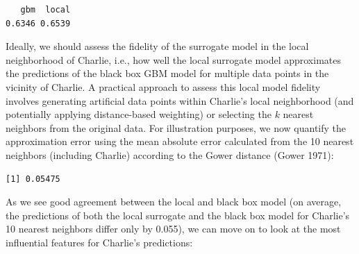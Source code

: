 \begin{verbatim}
   gbm  local 
0.6346 0.6539 
\end{verbatim}

Ideally, we should assess the fidelity of the surrogate model in the
local neighborhood of Charlie, i.e., how well the local surrogate model
approximates the predictions of the black box GBM model for multiple
data points in the vicinity of Charlie. A practical approach to assess
this local model fidelity involves generating artificial data points
within Charlie's local neighborhood (and potentially applying
distance-based weighting) or selecting the \(k\) nearest neighbors from
the original data. For illustration purposes, we now quantify the
approximation error using the mean absolute error calculated from the 10
nearest neighbors (including Charlie) according to the Gower distance
(Gower 1971):

\begin{Shaded}
\begin{Highlighting}[]
\OtherTok{=}\SpecialCharTok{::} \NormalTok{)}\SpecialCharTok{$}\NormalTok{index[, }\NormalTok{]}
\OtherTok{=}

\OtherTok{=}\SpecialCharTok{$}\NormalTok{(Charlie\_10nn)[[}\NormalTok{]]}
\OtherTok{=}\SpecialCharTok{$}\NormalTok{(Charlie\_10nn)[[}\NormalTok{]]}
\NormalTok{(}\SpecialCharTok{{-}}
\end{Highlighting}
\end{Shaded}

\begin{verbatim}
[1] 0.05475
\end{verbatim}

As we see good agreement between the local and black box model (on
average, the predictions of both the local surrogate and the black box
model for Charlie's 10 nearest neighbors differ only by 0.055), we can
move on to look at the most influential features for Charlie's
predictions:

\begin{Shaded}
\begin{Highlighting}[]
\SpecialCharTok{$}\NormalTok{results[, }\NormalTok{(}\NormalTok{, }\NormalTok{)]}
\end{Highlighting}
\end{Shaded}

